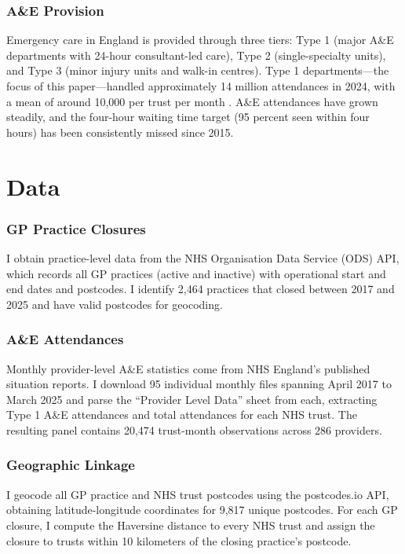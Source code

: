 \documentclass[12pt]{article}
\begin{document}
\subsubsection*{A\&E Provision}
Emergency care in England is provided through three tiers: Type 1 (major A\&E departments with 24-hour consultant-led care), Type 2 (single-specialty units), and Type 3 (minor injury units and walk-in centres). Type 1 departments---the focus of this paper---handled approximately 14 million attendances in 2024, with a mean of around 10,000 per trust per month \citep{nhse2025ae}. A\&E attendances have grown steadily, and the four-hour waiting time target (95 percent seen within four hours) has been consistently missed since 2015.


\section{Data}

\subsubsection*{GP Practice Closures}
I obtain practice-level data from the NHS Organisation Data Service (ODS) API, which records all GP practices (active and inactive) with operational start and end dates and postcodes. I identify 2,464 practices that closed between 2017 and 2025 and have valid postcodes for geocoding.

\subsubsection*{A\&E Attendances}
Monthly provider-level A\&E statistics come from NHS England's published situation reports. I download 95 individual monthly files spanning April 2017 to March 2025 and parse the ``Provider Level Data'' sheet from each, extracting Type 1 A\&E attendances and total attendances for each NHS trust. The resulting panel contains 20,474 trust-month observations across 286 providers.

\subsubsection*{Geographic Linkage}
I geocode all GP practice and NHS trust postcodes using the postcodes.io API, obtaining latitude-longitude coordinates for 9,817 unique postcodes. For each GP closure, I compute the Haversine distance to every NHS trust and assign the closure to trusts within 10 kilometers of the closing practice's postcode.
\end{document}
